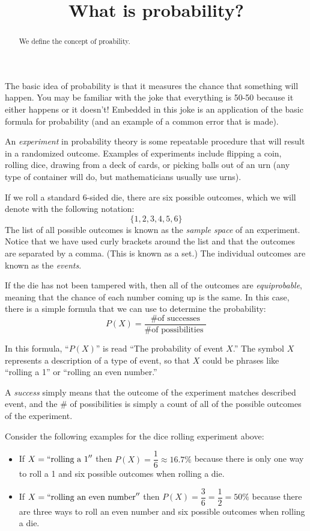 \documentclass{ximera}
\title{What is probability?}
\begin{document}
\begin{abstract}
We define the concept of proability.
\end{abstract}
\maketitle

The basic idea of probability is that it measures the chance that something will happen. You may be familiar with the joke that everything is 50-50 because it either happens or it doesn't! Embedded in this joke is an application of the basic formula for probability (and an example of a common error that is made).

An \emph{experiment} in probability theory is some repeatable procedure that will result in a randomized outcome. Examples of experiments include flipping a coin, rolling dice, drawing from a deck of cards, or picking balls out of an urn (any type of container will do, but mathematicians usually use urns).

If we roll a standard 6-sided die, there are six possible outcomes, which we will denote with the following notation:
\[ \{ 1, 2, 3, 4, 5, 6 \} \]
The list of all possible outcomes is known as the \emph{sample space} of an experiment. Notice that we have used curly brackets around the list and that the outcomes are separated by a comma. (This is known as a set.) The individual outcomes are known as the \emph{events}.

If the die has not been tampered with, then all of the outcomes are \emph{equiprobable}, meaning that the chance of each number coming up is the same. In this case, there is a simple formula that we can use to determine the probability:
\[ P(X) = \dfrac{ \text{ \# of successes }}{ \text{\# of possibilities } } \]

In this formula, ``$P(X)$'' is read ``The probability of event $X$.'' The symbol $X$ represents a description of a type of event, so that $X$ could be phrases like ``rolling a 1'' or ``rolling an even number.''

A \emph{success} simply means that the outcome of the experiment matches described event, and the \# of possibilities is simply a count of all of the possible outcomes of the experiment.

Consider the following examples for the dice rolling experiment above:
\begin{itemize}
  \item If $X = ``\text{rolling a 1}''$ then $P(X) = \dfrac{1}{6} \approx 16.7\%$ because there is only one way to roll a 1 and six possible outcomes when rolling a die.
  \item If $X = ``\text{rolling an even number}''$ then $P(X) = \dfrac{3}{6} = \dfrac{1}{2} = 50\%$ because there are three ways to roll an even number and six possible outcomes when rolling a die.
\end{itemize}
\end{document}
